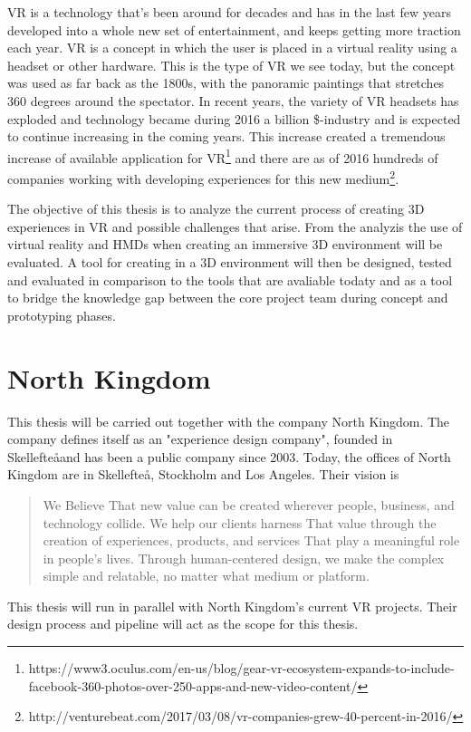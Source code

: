 VR is a technology that's been around for decades and has in the last few years developed into a whole new set of entertainment, and keeps getting more traction each year.\cite{VR:mazuryk1996virtual} VR is a concept in which the user is placed in a virtual reality using a headset or other hardware. This is the type of VR we see today, but the concept was used  as far back as the 1800s, with the panoramic paintings that stretches 360 degrees around the spectator. In recent years, the variety of VR headsets has exploded and technology became during 2016 a billion \$-industry and is expected to continue increasing in the coming years\cite{VR_stats:statista}.
This increase created a tremendous increase of available application for VR\footnote{https://www3.oculus.com/en-us/blog/gear-vr-ecosystem-expands-to-include-facebook-360-photos-over-250-apps-and-new-video-content/} and there are as of 2016 hundreds of companies working with developing experiences for this new medium\footnote{http://venturebeat.com/2017/03/08/vr-companies-grew-40-percent-in-2016/}.


The objective of this thesis is to analyze the current process of creating 3D experiences in VR and possible challenges that arise. From the analyzis the use of virtual reality and HMDs when creating an immersive 3D environment will be evaluated. A tool for creating in a 3D environment will then be designed, tested and evaluated in comparison to the tools that are avaliable todaty and as a tool to bridge the knowledge gap between the core project team during concept and prototyping phases.

\section{North Kingdom}
This thesis will be carried out together with the company North Kingdom. The company defines itself as an "experience design company", founded in Skellefte\aa and has been a public company since 2003. Today, the offices of North Kingdom are in Skellefte\aa, Stockholm and Los Angeles. \cite{northkingdom} Their vision is
\begin{quote}
We Believe That new value can be created wherever people, business, and technology collide. We help our clients harness That value through the creation of experiences, products, and services That play a meaningful role in people's lives. Through human-centered design, we make the complex simple and relatable, no matter what medium or platform\cite{northkingdom}.
\end{quote}
This thesis will run in parallel with North Kingdom's current VR projects. Their design process and pipeline will act as the scope for this thesis.
